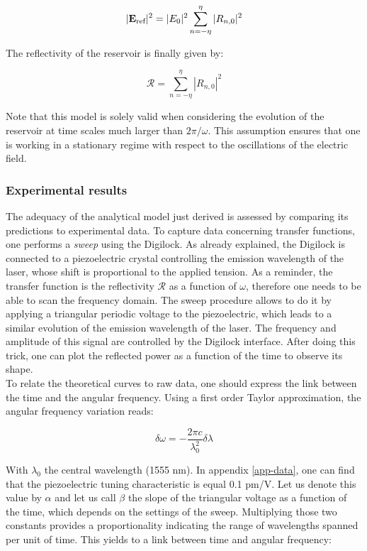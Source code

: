 \begin{equation}
	|\mathbf{E}_{\text{ref}}|^2 = |E_0|^2 \sum_{n=-\eta}^\eta |R_{n,0}|^2
\end{equation}

The reflectivity of the reservoir is finally given by:

\begin{equation}
	\mathcal{R} = \sum_{n=-\eta}^\eta |R_{n,0}|^2
\end{equation}

Note that this model is solely valid when considering the evolution of the reservoir at time scales much larger than $2\pi / \omega$. This assumption ensures that one is working in a stationary regime with respect to the oscillations of the electric field.


\subsubsection{Experimental results}

The adequacy of the analytical model just derived is assessed by comparing its predictions to experimental data. To capture data concerning transfer functions, one performs a \textit{sweep} using the Digilock. As already explained, the Digilock is connected to a piezoelectric crystal controlling the emission wavelength of the laser, whose shift is proportional to the applied tension. As a reminder, the transfer function is the reflectivity $\mathcal{R}$ as a function of $\omega$, therefore one needs to be able to scan the frequency domain. The sweep procedure allows to do it by applying a triangular periodic voltage to the piezoelectric, which leads to a similar evolution of the emission wavelength of the laser. The frequency and amplitude of this signal are controlled by the Digilock interface. After doing this trick, one can plot the reflected power as a function of the time to observe its shape.\\

To relate the theoretical curves to raw data, one should express the link between the time and the angular frequency. Using a first order Taylor approximation, the angular frequency variation reads:

\begin{equation}
	\delta \omega = -\frac{2\pi c}{\lambda_0^2} \delta \lambda
\end{equation}

With $\lambda_0$ the central wavelength (1555 nm). In appendix \ref{app-data}, one can find that the piezoelectric tuning characteristic is equal 0.1 pm/V. Let us denote this value by $\alpha$ and let us call $\beta$ the slope of the triangular voltage as a function of the time, which depends on the settings of the sweep. Multiplying those two constants provides a proportionality indicating the range of wavelengths spanned per unit of time. This yields to a link between time and angular frequency:

